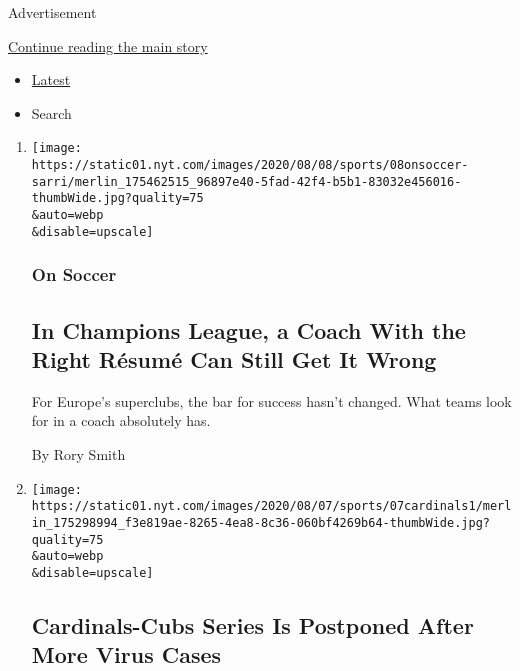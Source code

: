 Advertisement

\protect\hyperlink{after-mid1}{Continue reading the main story}

\begin{itemize}
\tightlist
\item
  \protect\hyperlink{stream-panel}{Latest}
\item
  Search
\end{itemize}

\begin{enumerate}
\def\labelenumi{\arabic{enumi}.}
\item
  \href{/2020/08/08/sports/soccer/juventus-sarri-champions-league.html}{}

  \texttt{[image: https://static01.nyt.com/images/2020/08/08/sports/08onsoccer-sarri/merlin\_175462515\_96897e40-5fad-42f4-b5b1-83032e456016-thumbWide.jpg?quality=75\\\&auto=webp\\\&disable=upscale]}

  \hypertarget{on-soccer-1}{%
  \subsubsection{On Soccer}\label{on-soccer-1}}

  \hypertarget{in-champions-league-a-coach-with-the-right-ruxe9sumuxe9-can-still-get-it-wrong-1}{%
  \subsection{In Champions League, a Coach With the Right Résumé Can
  Still Get It
  Wrong}\label{in-champions-league-a-coach-with-the-right-ruxe9sumuxe9-can-still-get-it-wrong-1}}

  For Europe's superclubs, the bar for success hasn't changed. What
  teams look for in a coach absolutely has.

  By Rory Smith
\item
  \href{/2020/08/07/sports/baseball/cardinals-game-postponed-coronavirus.html}{}

  \texttt{[image: https://static01.nyt.com/images/2020/08/07/sports/07cardinals1/merlin\_175298994\_f3e819ae-8265-4ea8-8c36-060bf4269b64-thumbWide.jpg?quality=75\\\&auto=webp\\\&disable=upscale]}

  \hypertarget{cardinals-cubs-series-is-postponed-after-more-virus-cases}{%
  \subsection{Cardinals-Cubs Series Is Postponed After More Virus
  Cases}\label{cardinals-cubs-series-is-postponed-after-more-virus-cases}}


\end{enumerate}
